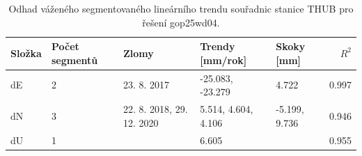 \begin{table}[htbp]
\caption{Odhad váženého segmentovaného lineárního trendu souřadnic stanice THUB pro řešení gop25wd04.}
\label{tab:gop25wd04_stcd_thub_weighted_multiseg}
\begin{tabular}{lllllr}
\toprule
Složka & Počet segmentů & Zlomy & Trendy [mm/rok] & Skoky [mm] & $R^2$ \\
\midrule
dE & 2 & 23. 8. 2017 & -25.083, -23.279 & 4.722 & 0.997 \\
dN & 3 & 22. 8. 2018, 29. 12. 2020 & 5.514, 4.604, 4.106 & -5.199, 9.736 & 0.946 \\
dU & 1 &  & 6.605 &  & 0.955 \\
\bottomrule
\end{tabular}
\end{table}
